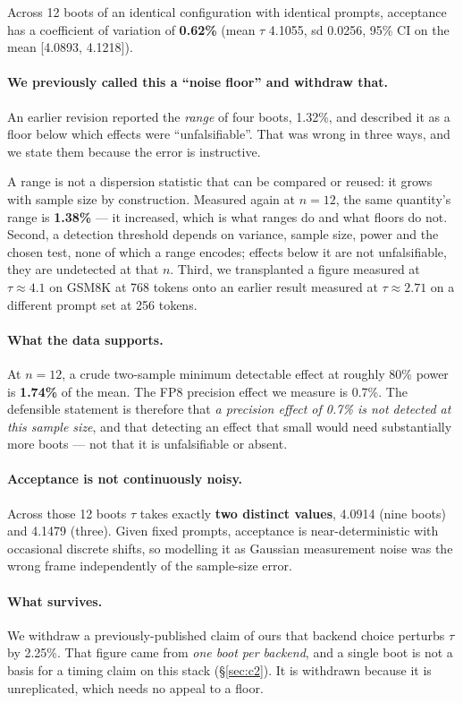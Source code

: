 \documentclass[11pt]{article}
\begin{document}
Across 12 boots of an identical configuration with identical prompts,
acceptance has a coefficient of variation of \textbf{0.62\%} (mean $\tau$
4.1055, sd 0.0256, 95\% CI on the mean [4.0893, 4.1218]).

\paragraph{We previously called this a ``noise floor'' and withdraw that.}
An earlier revision reported the \emph{range} of four boots, 1.32\%, and
described it as a floor below which effects were ``unfalsifiable''. That was
wrong in three ways, and we state them because the error is instructive.

A range is not a dispersion statistic that can be compared or reused: it
grows with sample size by construction. Measured again at $n = 12$, the same
quantity's range is \textbf{1.38\%} --- it increased, which is what ranges
do and what floors do not. Second, a detection threshold depends on
variance, sample size, power and the chosen test, none of which a range
encodes; effects below it are not unfalsifiable, they are undetected at that
$n$. Third, we transplanted a figure measured at $\tau \approx 4.1$ on
GSM8K at 768 tokens onto an earlier result measured at $\tau \approx 2.71$
on a different prompt set at 256 tokens.

\paragraph{What the data supports.} At $n = 12$, a crude two-sample
minimum detectable effect at roughly 80\% power is \textbf{1.74\%} of the
mean. The FP8 precision effect we measure is 0.7\%. The defensible statement
is therefore that \emph{a precision effect of 0.7\% is not detected at this
sample size}, and that detecting an effect that small would need
substantially more boots --- not that it is unfalsifiable or absent.

\paragraph{Acceptance is not continuously noisy.} Across those 12 boots
$\tau$ takes exactly \textbf{two distinct values}, 4.0914 (nine boots) and
4.1479 (three). Given fixed prompts, acceptance is near-deterministic with
occasional discrete shifts, so modelling it as Gaussian measurement noise
was the wrong frame independently of the sample-size error.

\paragraph{What survives.} We withdraw a previously-published claim of ours
that backend choice perturbs $\tau$ by 2.25\%. That figure came from
\emph{one boot per backend}, and a single boot is not a basis for a timing
claim on this stack (\S\ref{sec:c2}). It is withdrawn because it is
unreplicated, which needs no appeal to a floor.
\end{document}

